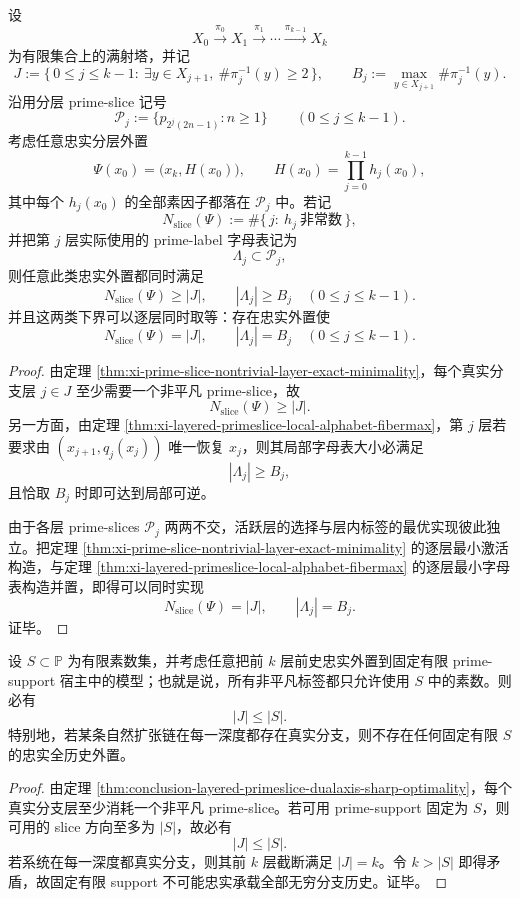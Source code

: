 \begin{theorem}\label{thm:conclusion-layered-primeslice-dualaxis-sharp-optimality}
设
\[
X_0\xrightarrow{\pi_0}X_1\xrightarrow{\pi_1}\cdots\xrightarrow{\pi_{k-1}}X_k
\]
为有限集合上的满射塔，并记
\[
J:=\{\,0\le j\le k-1:\ \exists y\in X_{j+1},\ \#\pi_j^{-1}(y)\ge 2\,\},
\qquad
B_j:=\max_{y\in X_{j+1}}\#\pi_j^{-1}(y).
\]
沿用分层 prime-slice 记号
\[
\mathcal P_j:=\{p_{2^j(2n-1)}:n\ge 1\}
\qquad(0\le j\le k-1).
\]
考虑任意忠实分层外置
\[
\Psi(x_0)=\bigl(x_k,H(x_0)\bigr),
\qquad
H(x_0)=\prod_{j=0}^{k-1}h_j(x_0),
\]
其中每个 \(h_j(x_0)\) 的全部素因子都落在 \(\mathcal P_j\) 中。若记
\[
N_{\mathrm{slice}}(\Psi):=\#\{\,j:\ h_j\ \text{非常数}\,\},
\]
并把第 \(j\) 层实际使用的 prime-label 字母表记为
\[
\Lambda_j\subset \mathcal P_j,
\]
则任意此类忠实外置都同时满足
\[
N_{\mathrm{slice}}(\Psi)\ge |J|,
\qquad
|\Lambda_j|\ge B_j
\quad(0\le j\le k-1).
\]
并且这两类下界可以逐层同时取等：存在忠实外置使
\[
N_{\mathrm{slice}}(\Psi)=|J|,
\qquad
|\Lambda_j|=B_j
\quad(0\le j\le k-1).
\]
\end{theorem}
\begin{proof}
由定理 \ref{thm:xi-prime-slice-nontrivial-layer-exact-minimality}，每个真实分支层 \(j\in J\) 至少需要一个非平凡 prime-slice，故
\[
N_{\mathrm{slice}}(\Psi)\ge |J|.
\]
另一方面，由定理 \ref{thm:xi-layered-primeslice-local-alphabet-fibermax}，第 \(j\) 层若要求由 \((x_{j+1},q_j(x_j))\) 唯一恢复 \(x_j\)，则其局部字母表大小必满足
\[
|\Lambda_j|\ge B_j,
\]
且恰取 \(B_j\) 时即可达到局部可逆。

由于各层 prime-slices \(\mathcal P_j\) 两两不交，活跃层的选择与层内标签的最优实现彼此独立。把定理 \ref{thm:xi-prime-slice-nontrivial-layer-exact-minimality} 的逐层最小激活构造，与定理 \ref{thm:xi-layered-primeslice-local-alphabet-fibermax} 的逐层最小字母表构造并置，即得可以同时实现
\[
N_{\mathrm{slice}}(\Psi)=|J|,
\qquad
|\Lambda_j|=B_j.
\]
证毕。
\end{proof}

\begin{corollary}\label{cor:conclusion-layered-primeslice-finite-support-depth-ceiling}
设 \(S\subset\mathbb P\) 为有限素数集，并考虑任意把前 \(k\) 层前史忠实外置到固定有限 prime-support 宿主中的模型；也就是说，所有非平凡标签都只允许使用 \(S\) 中的素数。则必有
\[
|J|\le |S|.
\]
特别地，若某条自然扩张链在每一深度都存在真实分支，则不存在任何固定有限 \(S\) 的忠实全历史外置。
\end{corollary}
\begin{proof}
由定理 \ref{thm:conclusion-layered-primeslice-dualaxis-sharp-optimality}，每个真实分支层至少消耗一个非平凡 prime-slice。若可用 prime-support 固定为 \(S\)，则可用的 slice 方向至多为 \(|S|\)，故必有
\[
|J|\le |S|.
\]
若系统在每一深度都真实分支，则其前 \(k\) 层截断满足 \(|J|=k\)。令 \(k>|S|\) 即得矛盾，故固定有限 support 不可能忠实承载全部无穷分支历史。证毕。
\end{proof}

